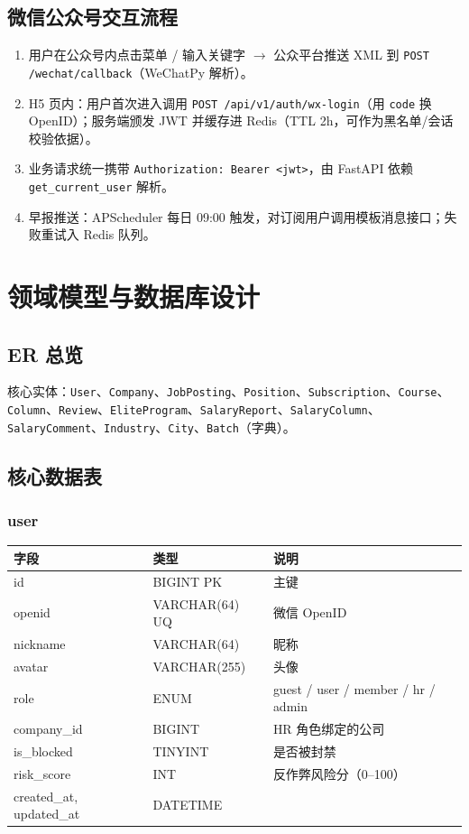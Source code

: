 \documentclass[11pt,a4paper]{ctexart}
\begin{document}
\subsection{微信公众号交互流程}
\begin{enumerate}[leftmargin=2em]
    \item 用户在公众号内点击菜单 / 输入关键字 $\rightarrow$ 公众平台推送 XML 到 \texttt{POST /wechat/callback}（WeChatPy 解析）。
    \item H5 页内：用户首次进入调用 \texttt{POST /api/v1/auth/wx-login}（用 \texttt{code} 换 OpenID）；服务端颁发 JWT 并缓存进 Redis（TTL 2h，可作为黑名单/会话校验依据）。
    \item 业务请求统一携带 \texttt{Authorization: Bearer <jwt>}，由 FastAPI 依赖 \texttt{get\_current\_user} 解析。
    \item 早报推送：APScheduler 每日 09:00 触发，对订阅用户调用模板消息接口；失败重试入 Redis 队列。
\end{enumerate}

\section{领域模型与数据库设计}

\subsection{ER 总览}
核心实体：\texttt{User}、\texttt{Company}、\texttt{JobPosting}、\texttt{Position}、\texttt{Subscription}、\texttt{Course}、\texttt{Column}、\texttt{Review}、\texttt{EliteProgram}、\texttt{SalaryReport}、\texttt{SalaryColumn}、\texttt{SalaryComment}、\texttt{Industry}、\texttt{City}、\texttt{Batch}（字典）。

\subsection{核心数据表}

\subsubsection{user}
\begin{longtable}{p{3cm}p{3cm}p{8cm}}
\toprule
\textbf{字段} & \textbf{类型} & \textbf{说明}\\
\midrule
id & BIGINT PK & 主键\\
openid & VARCHAR(64) UQ & 微信 OpenID\\
nickname & VARCHAR(64) & 昵称\\
avatar & VARCHAR(255) & 头像\\
role & ENUM & guest / user / member / hr / admin\\
company\_id & BIGINT & HR 角色绑定的公司\\
is\_blocked & TINYINT & 是否被封禁\\
risk\_score & INT & 反作弊风险分（0--100）\\
created\_at, updated\_at & DATETIME & \\
\bottomrule
\end{longtable}
\end{document}
